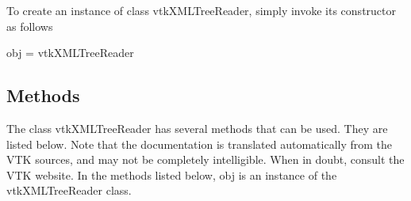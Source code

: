 To create an instance of class vtk\-X\-M\-L\-Tree\-Reader, simply invoke its constructor as follows \begin{DoxyVerb}  obj = vtkXMLTreeReader
\end{DoxyVerb}
 \hypertarget{vtkwidgets_vtkxyplotwidget_Methods}{}\subsection{Methods}\label{vtkwidgets_vtkxyplotwidget_Methods}
The class vtk\-X\-M\-L\-Tree\-Reader has several methods that can be used. They are listed below. Note that the documentation is translated automatically from the V\-T\-K sources, and may not be completely intelligible. When in doubt, consult the V\-T\-K website. In the methods listed below, {\ttfamily obj} is an instance of the vtk\-X\-M\-L\-Tree\-Reader class. 
